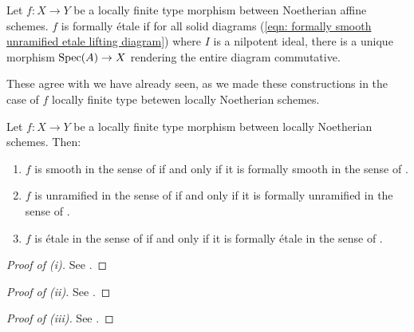 \begin{definition}\label{def: formally etale}
    Let $f:X\to Y$ be a locally finite type morphism between Noetherian affine schemes. $f$ is formally \'{e}tale if for all solid diagrams (\ref{eqn: formally smooth unramified etale lifting diagram}) where $I$ is a nilpotent ideal, there is a unique morphism $\operatorname{Spec}(A)\to X$ rendering the entire diagram commutative. 
\end{definition}
These agree with  we have already seen, as we made these constructions in the case of $f$ locally finite type betewen locally Noetherian schemes. 
\begin{proposition}\label{prop: formal is ordinary}
    Let $f:X\to Y$ be a locally finite type morphism between locally Noetherian schemes. Then:
    \begin{enumerate}[label=(\roman*)]
        \item $f$ is smooth in the sense of  if and only if it is formally smooth in the sense of . 
        \item $f$ is unramified in the sense of  if and only if it is formally unramified in the sense of . 
        \item $f$ is \'{e}tale in the sense of  if and only if it is formally \'{e}tale in the sense of . 
    \end{enumerate}
\end{proposition}
\begin{proof}[Proof of (i)]
    See \cite[\href{https://stacks.math.columbia.edu/tag/02H6}{Tag 02H6}]{stacks-project}.
\end{proof}
\begin{proof}[Proof of (ii)]
    See \cite[\href{https://stacks.math.columbia.edu/tag/02HE}{Tag 02HE}]{stacks-project}.
\end{proof}
\begin{proof}[Proof of (iii)]
    See \cite[\href{https://stacks.math.columbia.edu/tag/02HM}{Tag 02HM}]{stacks-project}.
\end{proof}
